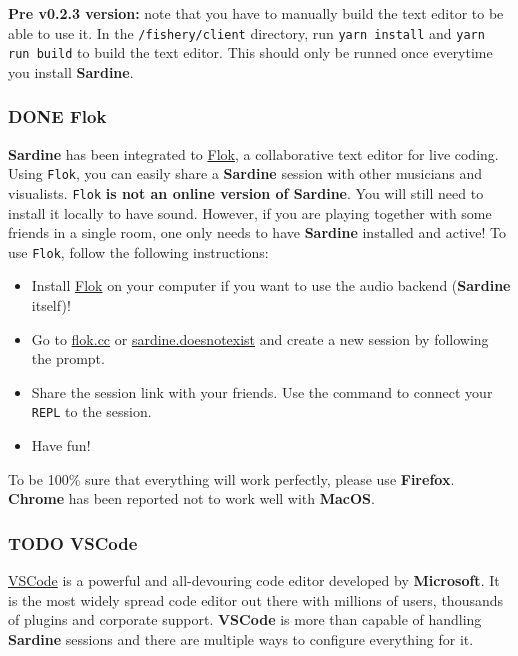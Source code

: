 \documentclass[11pt]{article}
\begin{document}
\textbf{Pre v0.2.3 version:} note that you have to manually build the text editor to be able to use it. In the \texttt{/fishery/client} directory, run \texttt{yarn install} and \texttt{yarn run build} to build the text editor. This should only be runned once everytime you install \textbf{Sardine}.

\subsubsection{{\bfseries\sffamily DONE} Flok}
\label{sec:org9e0f09f}

\textbf{Sardine} has been integrated to \href{https://github.com/munshkr/flok}{Flok}, a collaborative text editor for live coding. Using \texttt{Flok}, you can easily share a \textbf{Sardine} session with other musicians and visualists. \texttt{Flok} \textbf{is not an online version of Sardine}. You will still need to install it locally to have sound. However, if you are playing together with some friends in a single room, one only needs to have \textbf{Sardine} installed and active! To use \texttt{Flok}, follow the following instructions:
\begin{itemize}
\item Install \href{https://github.com/munshkr/flok}{Flok} on your computer if you want to use the audio backend (\textbf{Sardine} itself)!
\item Go to \href{https://flok.cc}{flok.cc} or \href{https://sardine.doesnotexist.club}{sardine.doesnotexist} and create a new session by following the prompt.
\item Share the session link with your friends. Use the command to connect your \texttt{REPL} to the session.
\item Have fun!
\end{itemize}

To be 100\% sure that everything will work perfectly, please use \textbf{Firefox}. \textbf{Chrome} has been reported not to work well with \textbf{MacOS}.

\subsubsection{{\bfseries\sffamily TODO} VSCode}
\label{sec:org5f58bed}

\href{https://code.visualstudio.com/}{VSCode} is a powerful and all-devouring code editor developed by \textbf{\textbf{Microsoft}}. It is the most widely spread code editor out there with millions of users, thousands of plugins and corporate support. \textbf{VSCode} is more than capable of handling \textbf{Sardine} sessions and there are multiple ways to configure everything for it.
\end{document}
